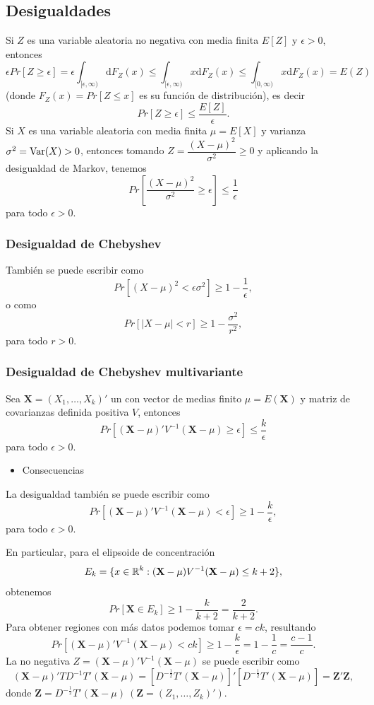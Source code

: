 \subsection{Desigualdades}
Si $Z$ es una variable aleatoria no negativa con media finita $E[Z]$ y $\epsilon>0$, entonces \[ \epsilon Pr[Z\ge\epsilon]=\epsilon\int_{[\epsilon,\infty)}\mathrm{d}F_Z(x)\le\int_{[\epsilon,\infty)}x\mathrm{d}F_Z(x)\le\int_{[0,\infty)}x\mathrm{d}F_Z(x)=E(Z) \] (donde $F_Z(x)=Pr[Z\le x]$ es su función de distribución), es decir \[ Pr[Z\ge \epsilon]\le\dfrac{E[Z]}{\epsilon}. \]
Si $X$ es una variable aleatoria con media finita $\mu=E[X]$ y varianza $\sigma^2=\operatorname{Var}(X)>0$, entonces tomando $Z=\dfrac{(X-\mu)^2}{\sigma^2}\ge0$ y aplicando la desigualdad de Markov, tenemos \[ Pr\left[\dfrac{(X-\mu)^2}{\sigma^2}\ge\epsilon\right]\le\dfrac{1}{\epsilon} \]para todo $\epsilon>0$.
\subsubsection{Desigualdad de Chebyshev}
También se puede escribir como \[ Pr[(X-\mu)^2<\epsilon\sigma^2]\ge1-\dfrac{1}{\epsilon}, \] o como \[ Pr[|X-\mu|<r]\ge1-\dfrac{\sigma^2}{r^2}, \] para todo $r>0$.
\subsubsection{Desigualdad de Chebyshev multivariante}
Sea $\mathbf{X}=(X_1,\dots,X_k)'$ un \vea con vector de medias finito $\mu=E(\mathbf{X})$ y matriz de covarianzas definida positiva $V$, entonces \[ Pr[(\mathbf{X}-\mu)'V^{-1}(\mathbf{X}-\mu)\ge\epsilon]\le\dfrac{k}{\epsilon} \]para todo $\epsilon>0$.
\begin{itemize}[label=\color{red}\textbullet, leftmargin=*]
	\item \color{lightblue}Consecuencias
\end{itemize}
La desigualdad también se puede escribir como \[ Pr[(\mathbf{X}-\mu)'V^{-1}(\mathbf{X}-\mu)<\epsilon]\ge1-\dfrac{k}{\epsilon}, \] para todo $\epsilon>0$.

En particular, para el elipsoide de concentración \[ E_k=\{x\in\operatorname{\mathbb{R}}^k:(\mathbf{X}-\mu)V^{-1}(\mathbf{X}-\mu)\le k+2\}, \] obtenemos \[ Pr[\mathbf{X}\in E_k]\ge1-\dfrac{k}{k+2}=\dfrac{2}{k+2}. \]
Para obtener regiones con más datos podemos tomar $\epsilon=ck$, resultando \[ Pr[(\mathbf{X}-\mu)'V^{-1}(\mathbf{X}-\mu)<ck]\ge1-\dfrac{k}{\epsilon}=1-\dfrac{1}{c}=\dfrac{c-1}{c}. \]
La \va no negativa $Z=(\mathbf{X}-\mu)'V^{-1}(\mathbf{X}-\mu)$ se puede escribir como \[ (\mathbf{X}-\mu)'TD^{-1}T'(\mathbf{X}-\mu)=\left[D^{-\frac{1}{2}}T'(\mathbf{X}-\mu)\right]'[D^{-\frac{1}{2}}T'(\mathbf{X}-\mu)]=\mathbf{Z'Z}, \] donde $\mathbf{Z}=D^{-\frac{1}{2}}T'(\mathbf{X}-\mu)\:(\mathbf{Z}=(Z_1,\dots,Z_k)')$.

